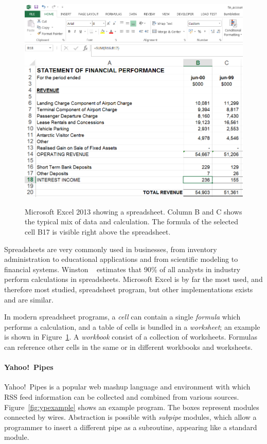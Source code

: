 \documentclass[10pt,conference,compsocconf]{IEEEtran}
\begin{document}
\begin{figure}
\caption{Microsoft Excel 2013 showing a spreadsheet. Column B and C shows the typical mix of data and calculation. The formula of the selected cell B17 is visible right above the spreadsheet.}
\centering
\includegraphics[width=\columnwidth]{excel-2}
\label{fig:spreadsheetexample}
\end{figure}

Spreadsheets are very commonly used in businesses, from inventory administration to educational applications and from scientific modeling to financial systems.
Winston ~\cite{Wins2001} estimates that 90\% of all analysts in industry perform calculations in spreadsheets. 
Microsoft Excel is by far the most used, and therefore most studied, spreadsheet program, but other implementations exists and are similar.

In modern spreadsheet programs, a \textit{cell} can contain a single \textit{formula} which performs a calculation, and a table of cells is bundled in a \textit{worksheet}; an example is shown in Figure~\ref{fig:spreadsheetexample}. 
A \textit{workbook} consist of a collection of worksheets.
Formulas can reference other cells in the same or in different workbooks and worksheets.


\paragraph{Yahoo!\ Pipes}
Yahoo!\ Pipes is a popular web mashup language and environment with which RSS feed information can be collected and combined from various sources.  Figure~\ref{fig:ypexample} shows an example program. The boxes represent modules connected by wires. 
Abstraction is possible with \emph{subpipe} modules, which allow a programmer to insert a different pipe as a subroutine, appearing like a standard module. 
\end{document}
